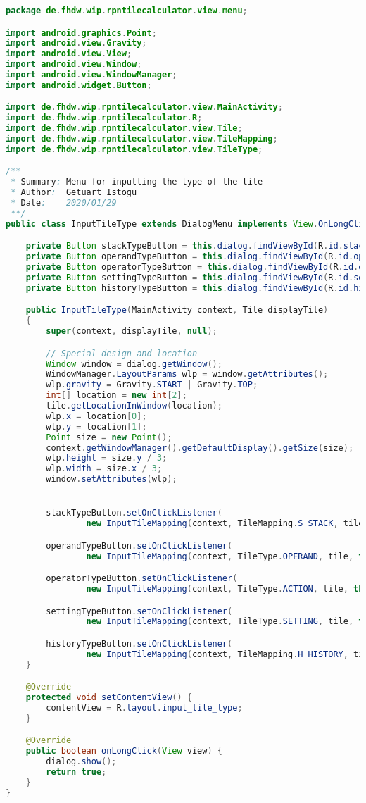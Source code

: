\begin{lstlisting}[caption=InputTileType,label=list:InputTileType,language=Java]
package de.fhdw.wip.rpntilecalculator.view.menu;

import android.graphics.Point;
import android.view.Gravity;
import android.view.View;
import android.view.Window;
import android.view.WindowManager;
import android.widget.Button;

import de.fhdw.wip.rpntilecalculator.view.MainActivity;
import de.fhdw.wip.rpntilecalculator.R;
import de.fhdw.wip.rpntilecalculator.view.Tile;
import de.fhdw.wip.rpntilecalculator.view.TileMapping;
import de.fhdw.wip.rpntilecalculator.view.TileType;

/**
 * Summary: Menu for inputting the type of the tile
 * Author:  Getuart Istogu
 * Date:    2020/01/29
 **/
public class InputTileType extends DialogMenu implements View.OnLongClickListener {

    private Button stackTypeButton = this.dialog.findViewById(R.id.stackTypeButton);
    private Button operandTypeButton = this.dialog.findViewById(R.id.operandTypeButton);
    private Button operatorTypeButton = this.dialog.findViewById(R.id.operatorTypeButton);
    private Button settingTypeButton = this.dialog.findViewById(R.id.settingTypeButton);
    private Button historyTypeButton = this.dialog.findViewById(R.id.historyTypeButton);

    public InputTileType(MainActivity context, Tile displayTile)
    {
        super(context, displayTile, null);

        // Special design and location
        Window window = dialog.getWindow();
        WindowManager.LayoutParams wlp = window.getAttributes();
        wlp.gravity = Gravity.START | Gravity.TOP;
        int[] location = new int[2];
        tile.getLocationInWindow(location);
        wlp.x = location[0];
        wlp.y = location[1];
        Point size = new Point();
        context.getWindowManager().getDefaultDisplay().getSize(size);
        wlp.height = size.y / 3;
        wlp.width = size.x / 3;
        window.setAttributes(wlp);


        stackTypeButton.setOnClickListener(
                new InputTileMapping(context, TileMapping.S_STACK, tile, this));

        operandTypeButton.setOnClickListener(
                new InputTileMapping(context, TileType.OPERAND, tile, this));

        operatorTypeButton.setOnClickListener(
                new InputTileMapping(context, TileType.ACTION, tile, this));

        settingTypeButton.setOnClickListener(
                new InputTileMapping(context, TileType.SETTING, tile, this));

        historyTypeButton.setOnClickListener(
                new InputTileMapping(context, TileMapping.H_HISTORY, tile, this));
    }

    @Override
    protected void setContentView() {
        contentView = R.layout.input_tile_type;
    }

    @Override
    public boolean onLongClick(View view) {
        dialog.show();
        return true;
    }
}
\end{lstlisting}    

